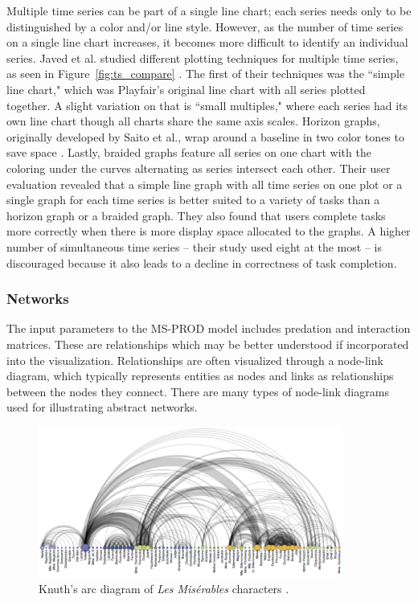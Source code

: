 \documentclass{article}
\begin{document}
Multiple time series can be part of a single line chart; each series needs only to be distinguished by a color and/or line style.  However, as the number of time series on a single line chart increases, it becomes more difficult to identify an individual series.  Javed et al. studied different plotting techniques for multiple time series, as seen in Figure~\ref{fig:ts_compare} \cite{Javed:2010:GPM:1907651.1907971}.  The first of their techniques was the ``simple line chart," which was Playfair's original line chart with all series plotted together.  A slight variation on that is ``small multiples," where each series had its own line chart though all charts share the same axis scales.  Horizon graphs, originally developed by Saito et al., wrap around a baseline in two color tones to save space \cite{saitoTwoTone}.  Lastly, braided graphs feature all series on one chart with the coloring under the curves alternating as series intersect each other.  Their user evaluation revealed that a simple line graph with all time series on one plot or a single graph for each time series is better suited to a variety of tasks than a horizon graph or a braided graph.  They also found that users complete tasks more correctly when there is more display space allocated to the graphs.  A higher number of simultaneous time series -- their study used eight at the most -- is discouraged because it also leads to a decline in correctness of task completion.

\subsubsection{Networks}

The input parameters to the MS-PROD model includes predation and interaction matrices.  These are relationships which may be better understood if incorporated into the visualization. Relationships are often visualized through a node-link diagram, which typically represents entities as nodes and links as relationships between the nodes they connect.  There are many types of node-link diagrams used for illustrating abstract networks.


\begin{figure}[h]
	\centering
	\includegraphics[width=10cm]{figures/arcdiagram.eps}
	\caption{Knuth's arc diagram of \textit{Les Mis\'erables} characters \cite{Knuth:1993:SGP:164984}.}
	\label{fig:arcdiagram}
\end{figure}
\end{document}
